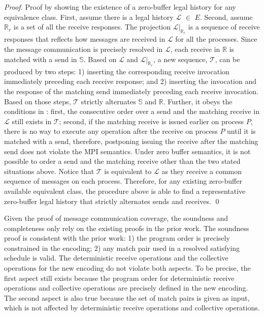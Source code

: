 \begin{proof}
Proof by showing the existence of a zero-buffer legal history for any equivalence class. First, assume there is a legal history $\mathcal{L}$ $\in$ $\mathit{E}$. Second, assume $\mathbb{R}_r$ is a set of all the receive responses. The projection $\mathcal{L} | _{\mathbb{R}_r}$ is a sequence of receive responses that reflects how messages are received in $\mathcal{L}$ for all the processes. Since the message communication is precisely resolved in $\mathcal{L}$, each receive in $\mathbb{R}$ is matched with a send in $\mathbb{S}$. Based on $\mathcal{L}$ and $\mathcal{L} | _{\mathbb{R}_r}$, a new sequence, $\mathcal{T}$, can be produced by two steps: 1) inserting the corresponding receive invocation immediately preceding each receive response; and 2) inserting the invocation and the response of the matching send immediately preceding each receive invocation. Based on those steps, $\mathcal{T}$ strictly alternates $\mathbb{S}$ and $\mathbb{R}$. Further, it obeys the conditions in : first, the consecutive order over a send and the matching receive in $\mathcal{L}$ still exists in $\mathcal{T}$; second, if the matching receive is issued earlier on process $P$, there is no way to execute any operation after the receive on process $P$ until it is matched with a send, therefore, postponing issuing the receive after the matching send does not violate the MPI semantics. Under zero buffer semantics, it is not possible to order a send and the matching receive other than the two stated situations above. Notice that $\mathcal{T}$ is equivalent to $\mathcal{L}$ as they receive a common sequence of messages on each process. Therefore, for any existing zero-buffer available equivalent class, the procedure above is able to find a representative zero-buffer legal history that strictly alternates sends and receives. \qed
\end{proof}

Given the proof of message communication coverage, the soundness and completeness only rely on the existing proofs in the prior work. The soundness proof is consistent with the prior work: 1) the program order is precisely constrained in the encoding; 2) any match pair used in a resolved satisfying schedule is valid. The deterministic receive operations and the collective operations for the new encoding do not violate both aspects. To be precise, the first aspect still exists because the program order for deterministic receive operations and collective operations are precisely defined in the new encoding. The second aspect is also true because the set of match pairs is given as input, which is not affected by deterministic receive operations and collective operations.

